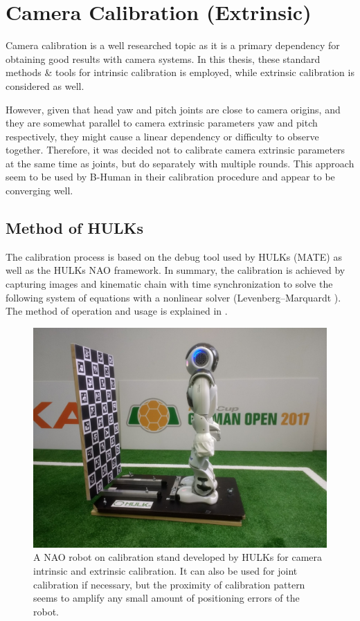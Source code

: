 \documentclass[english, printversion, nomenclature, notitle]{tuvisionthesis} %
\begin{document}
\section{Camera Calibration (Extrinsic)}

Camera calibration is a well researched topic as it is a primary dependency for obtaining good results with camera systems. In this thesis, these standard methods \& tools for intrinsic calibration is employed, while extrinsic calibration is considered as well.

However, given that head yaw and pitch joints are close to camera origins, and they are somewhat parallel to camera extrinsic parameters yaw and pitch respectively, they might cause a linear dependency or difficulty to observe together. Therefore, it was decided not to calibrate camera extrinsic parameters at the same time as joints, but do separately with multiple rounds. This approach seem to be used by B-Human in their calibration procedure \cite{thomas_rofer_b-human_2018} and appear to be converging well.

\subsection{Method of HULKs}

The calibration process is based on the debug tool used by HULKs (MATE) as well as the HULKs NAO framework. In summary, the calibration is achieved by capturing images and kinematic chain with time synchronization to solve the following system of equations with a nonlinear solver (Levenberg–Marquardt \cite{lev-mar}). The method of operation and usage is explained in \cite{darshana_adikari_team_2017}.

\begin{figure}
	\centering
	\includegraphics[width=0.7\linewidth]{figures/nao_on_stand1.jpg}
	\caption[A NAO robot on calibration stand.]{A NAO robot on calibration stand developed by HULKs for camera intrinsic and extrinsic calibration. It can also be used for joint calibration if necessary, but the proximity of calibration pattern seems to amplify any small amount of positioning errors of the robot.}
	\label{fig:naoonstand1}
\end{figure}
\end{document}
